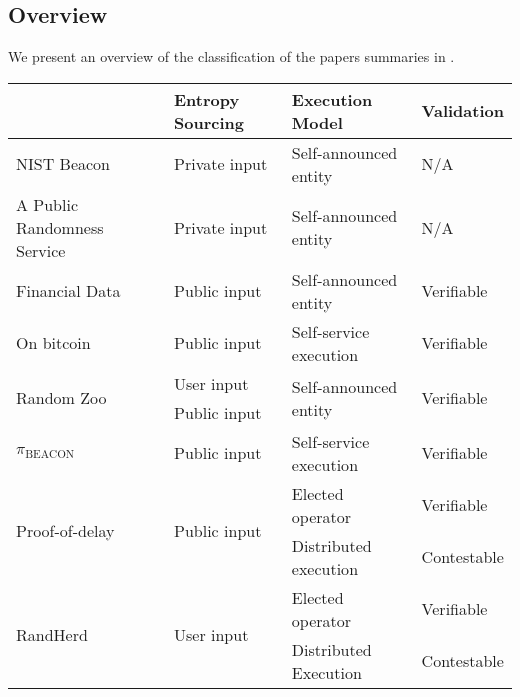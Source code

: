 \subsection{Overview}\label{sub:overview}
We present an overview of the classification of the papers summaries in .

\begin{table}[htbp]
    \centering
    \begin{tabularx}{\textwidth}{Xlll}
                                 & \textbf{Entropy Sourcing}     & \textbf{Execution Model}               & \textbf{Validation}         \\\midrule
NIST Beacon                      & Private input                 & Self-announced entity                  & N/A                         \\ [1.5em]
A Public Randomness Service      & Private input                 & Self-announced entity                  & N/A                         \\ [1.5em]
Financial Data                   & Public  input                 & Self-announced entity                  & Verifiable                  \\ [1.5em]
On bitcoin                       & Public input                  & Self-service execution                 & Verifiable                  \\ [1.5em]
\multirow{2}{*}{Random Zoo}      & User input                    & \multirow{2}{*}{Self-announced entity} & \multirow{2}{*}{Verifiable} \\
                                 & Public input                  &                                        & \\ [1.5em]
$\pi_\text{BEACON}$              & Public input                  & Self-service execution                 & Verifiable                  \\ [1.5em]
\multirow{2}{*}{Proof-of-delay}  & \multirow{2}{*}{Public input} & Elected operator                       & Verifiable                  \\
                                 &                               & Distributed execution                  & Contestable                 \\ [1.5em]
\multirow{2}{*}{RandHerd}        & \multirow{2}{*}{User input}   & Elected operator                       & Verifiable                  \\
                                 &                               & Distributed Execution                  & Contestable                 \\ [1.5em]

\end{tabularx}
\end{table}
